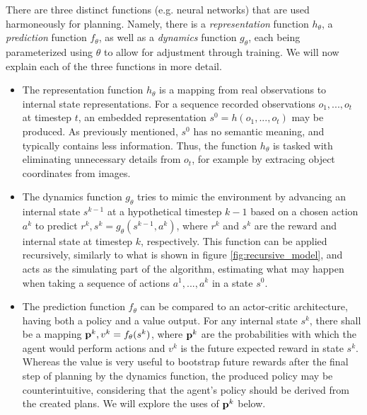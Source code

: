 There are three distinct functions (e.g. neural networks) that are used harmoneously for planning. Namely, there is a \textit{representation} function $h_\theta$, a \textit{prediction} function $f_\theta$, as well as a \textit{dynamics} function $g_\theta$, each being parameterized using $\theta$ to allow for adjustment through training. We will now explain each of the three functions in more detail.
\begin{itemize}
    \item The representation function $h_\theta$ is a mapping from real observations to internal state representations. For a sequence recorded observations $o_1, ..., o_t$ at timestep $t$, an embedded representation $s^0 = h(o_1, ..., o_t)$ may be produced. As previously mentioned, $s^0$ has no semantic meaning, and typically contains less information. Thus, the function $h_\theta$ is tasked with eliminating unnecessary details from $o_t$, for example by extracing object coordinates from images.

    \item The dynamics function $g_\theta$ tries to mimic the environment by advancing an internal state $s^{k-1}$ at a hypothetical timestep $k-1$ based on a chosen action $a^k$ to predict $r^k, s^k = g_\theta\left(s^{k-1}, a^k\right)$, where $r^k$ and $s^k$ are the reward and internal state at timestep $k$, respectively. This function can be applied recursively, similarly to what is shown in figure \ref{fig:recursive_model}, and acts as the simulating part of the algorithm, estimating what may happen when taking a sequence of actions $a^1, ..., a^k$ in a state $s^0$.

    \item The prediction function $f_\theta$ can be compared to an actor-critic architecture, having both a policy and a value output. For any internal state $s^k$, there shall be a mapping $\text{\textbf{p}}^k, v^k = f_\theta(s^k)$, where $\text{\textbf{p}}^k$ are the probabilities with which the agent would perform actions and $v^k$ is the future expected reward in state $s^k$. Whereas the value is very useful to bootstrap future rewards after the final step of planning by the dynamics function, the produced policy may be counterintuitive, considering that the agent's policy should be derived from the created plans. We will explore the uses of $\text{\textbf{p}}^k$ below.
\end{itemize}

